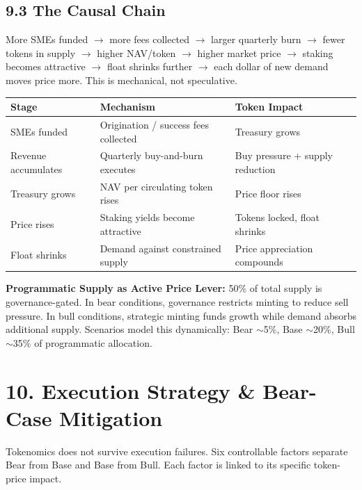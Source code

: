 \documentclass[
  paper=a4,
  ,captions=tableheading
]{scrartcl}
\begin{document}
\subsection{9.3 The Causal Chain}\label{causal-chain}

More SMEs funded $\rightarrow$ more fees collected $\rightarrow$ larger quarterly burn $\rightarrow$ fewer tokens in supply $\rightarrow$ higher NAV/token $\rightarrow$ higher market price $\rightarrow$ staking becomes attractive $\rightarrow$ float shrinks further $\rightarrow$ each dollar of new demand moves price more. This is mechanical, not speculative.

\begin{center}
\begin{tabular}{lll}
\toprule
\textbf{Stage} & \textbf{Mechanism} & \textbf{Token Impact} \\
\midrule
SMEs funded & Origination / success fees collected & Treasury grows \\
Revenue accumulates & Quarterly buy-and-burn executes & Buy pressure + supply reduction \\
Treasury grows & NAV per circulating token rises & Price floor rises \\
Price rises & Staking yields become attractive & Tokens locked, float shrinks \\
Float shrinks & Demand against constrained supply & Price appreciation compounds \\
\bottomrule
\end{tabular}
\end{center}

\textbf{Programmatic Supply as Active Price Lever:} 50\% of total supply is governance-gated. In bear conditions, governance restricts minting to reduce sell pressure. In bull conditions, strategic minting funds growth while demand absorbs additional supply. Scenarios model this dynamically: Bear $\sim$5\%, Base $\sim$20\%, Bull $\sim$35\% of programmatic allocation.

\section{10. Execution Strategy \& Bear-Case Mitigation}\label{execution-strategy}

Tokenomics does not survive execution failures. Six controllable factors separate Bear from Base and Base from Bull. Each factor is linked to its specific token-price impact.
\end{document}
